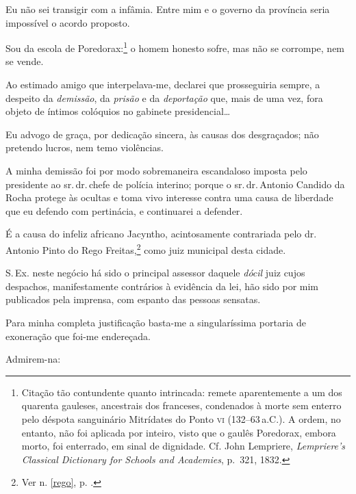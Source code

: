 Eu não sei transigir com a infâmia. Entre mim e o governo da província
seria impossível o acordo proposto.

Sou da escola de Poredorax:\footnote{Citação tão contundente quanto
  intrincada: remete aparentemente a um dos quarenta gauleses,
  ancestrais dos franceses, condenados à morte sem enterro pelo déspota
  sanguinário Mitrídates do Ponto \textsc{vi} (132--63\,a.C.). A ordem, no
  entanto, não foi aplicada por inteiro, visto que o gaulês Poredorax,
  embora morto, foi enterrado, em sinal de dignidade. Cf. John
  Lempriere, \emph{Lempriere's Classical Dictionary for Schools and
  Academies}, p.~321, 1832.} o homem honesto sofre, mas não se
corrompe, nem se vende.

Ao estimado amigo que interpelava-me, declarei que prosseguiria sempre,
a despeito da \emph{demissão}, da \emph{prisão} e da \emph{deportação}
que, mais de uma vez, fora objeto de íntimos colóquios no gabinete
presidencial\ldots{}

Eu advogo de graça, por dedicação sincera, às causas dos desgraçados;
não pretendo lucros, nem temo violências.

A minha demissão foi por modo sobremaneira escandaloso imposta pelo
presidente ao sr.\,dr.\,chefe de polícia interino; porque o sr.\,dr.\,Antonio Candido da Rocha protege às ocultas e toma vivo interesse contra
uma causa de liberdade que eu defendo com pertinácia, e continuarei a
defender.

É a causa do infeliz africano Jacyntho, acintosamente contrariada pelo
dr.\,Antonio Pinto do Rego Freitas,\footnote{Ver n. \ref{rego}, p. \pageref{rego}.} 
como juiz municipal desta cidade.

S.\,Ex. neste negócio há sido o principal assessor daquele \emph{dócil}
juiz cujos despachos, manifestamente contrários à evidência da lei, hão
sido por mim publicados pela imprensa, com espanto das pessoas sensatas.

Para minha completa justificação basta-me a singularíssima portaria de
exoneração que foi-me endereçada.

Admirem-na:

